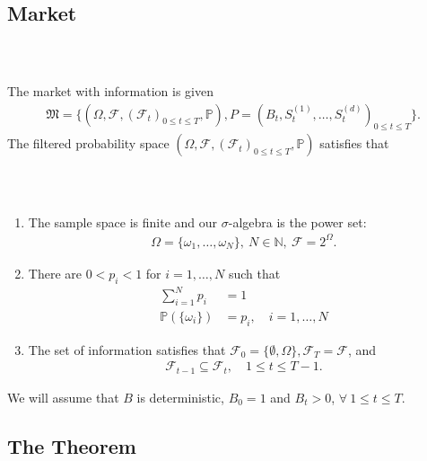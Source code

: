 \documentclass{beamer}
\numberwithin{equation}{section}
\begin{document}
\subsection{Market}

\begin{frame}\frametitle{{\normalsize \secname} \\ {\large \subsecname}}
    The market with information is given
    \begin{align*}
        \mathfrak{M} = \{ (\Omega, \mathscr{F}, (\mathscr{F}_t)_{0 \leq t \leq T}, \mathbb{P}), P = (B_t, S_t^{(1)}, \ldots, S_t^{(d)})_{0 \leq t \leq T} \}. 
    \end{align*} 
    The filtered probability space $(\Omega, \mathscr{F}, (\mathscr{F}_t)_{0 \leq t \leq T}, \mathbb{P})$ satisfies that 
\end{frame}

\begin{frame}\frametitle{{\normalsize \secname} \\ {\large \subsecname}}
    \begin{enumerate}
        \item The sample space is finite and our $\sigma$-algebra is the power set: 
        \begin{align*}
           \Omega = \{ \omega_1, \ldots, \omega_N\}, \ N \in \mathbb{N}, \ \mathscr{F} = 2^{\Omega}.
        \end{align*}
        \item There are $0 < p_i < 1$ for $i = 1, \ldots, N$ such that 
        \begin{align*}
            \sum_{i=1}^N p_i &= 1\\
            \mathbb{P}(\{ \omega_i \}) &= p_i, \quad i = 1, \ldots, N
        \end{align*}
        \item The set of information satisfies that $\mathscr{F}_0 = \{ \emptyset, \Omega\}, \mathscr{F}_T = \mathscr{F}$, and 
        \begin{align*}
            \mathscr{F}_{t-1} \subseteq \mathscr{F}_t, \quad 1 \leq t \leq T-1. 
        \end{align*}
    \end{enumerate}
    We will assume that $B$ is deterministic, $B_0 = 1$ and $B_t > 0$, $\forall \ 1 \leq t \leq T$.
\end{frame}

\subsection{The Theorem}
\end{document}
